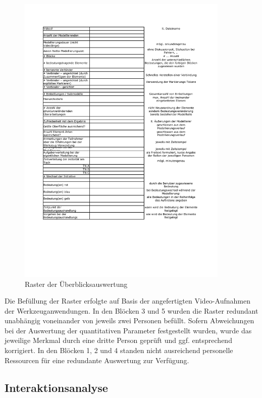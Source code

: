 \begin{figure}[htbp]
	\centering
		\includegraphics[width=0.9\textwidth]{img/AnhangEmpirie/raster.pdf}
	\caption{Raster der Überblicksauswertung}
	\label{fig:img_AnhangEmpirie_raster}
\end{figure}

Die Befüllung der Raster erfolgte auf Basis der angefertigten Video-Aufnahmen der Werkzeuganwendungen. In den Blöcken 3 und 5 wurden die Raster redundant unabhängig voneinander von jeweils zwei Personen befüllt. Sofern Abweichungen bei der Auswertung der quantitativen Parameter festgestellt wurden, wurde das jeweilige Merkmal durch eine dritte Person geprüft und ggf. entsprechend korrigiert. In den Blöcken 1, 2 und 4 standen nicht ausreichend personelle Ressourcen für eine redundante Auswertung zur Verfügung.

\subsection{Interaktionsanalyse}

